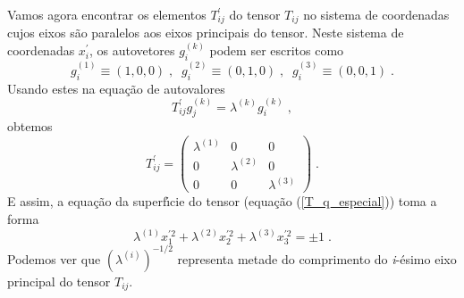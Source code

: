 Vamos agora encontrar os elementos $T_{ij}^{'}$ do tensor $T_{ij}$
no sistema de coordenadas cujos eixos s\~ao paralelos aos eixos
principais do tensor. Neste sistema de coordenadas $x_i^{'}$, os
autovetores $g_i^{(k)}$ podem ser escritos como
\begin{equation}
   g_i^{(1)}\equiv(1,0,0)\;, \;\; g_i^{(2)}\equiv(0,1,0)\;, \;\; g_i^{(3)}\equiv(0,0,1) \;.
   \label{auto_vet_x}
\end{equation}
Usando estes na equa\c{c}\~ao de autovalores
\begin{equation}
   T_{ij}^{'} g_j^{(k)} = \lambda^{(k)} g_i^{(k)} \;,
   \label{auto_esp_x}
\end{equation}
obtemos
\begin{equation} T_{ij}^{'} = \left(
\begin{array}{ccc}
   \lambda^{(1)} & 0 & 0 \\
   0 & \lambda^{(2)} & 0 \\
   0 & 0 & \lambda^{(3)}
   \label{auto_tens_diag}
\end{array} \right) \;.
\end{equation}
E assim, a equa\c{c}\~ao da superf\'{\i}cie do tensor
(equa\c{c}\~ao (\ref{T_q_especial})) toma a forma
\begin{equation}
\lambda^{(1)} x_1^{'2}+\lambda^{(2)} x_2^{'2}+\lambda^{(3)} x_3^{'2}= \pm 1 \;.
\label{T_q_especial_x}
\end{equation}
Podemos ver que $(\lambda^{(i)})^{-1/2}$ representa metade do
comprimento do {\it i}-\'esimo eixo principal do tensor $T_{ij}$.

